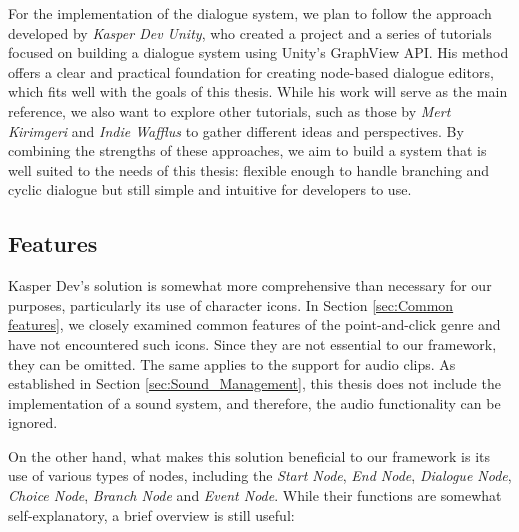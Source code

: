 For the implementation of the dialogue system, we plan to follow the approach developed by \textit{Kasper Dev Unity}, who created a project \cite{Kasper-Dialogue-Tutorial-git} and a series of tutorials \cite{Kasper-Dialogue-Tutorial-YT} focused on building a dialogue system using Unity’s GraphView API. His method offers a clear and practical foundation for creating node-based dialogue editors, which fits well with the goals of this thesis. While his work will serve as the main reference, we also want to explore other tutorials, such as those by \textit{Mert Kirimgeri} \cite{merpheus-Dialogue-Tutorial-git}\cite{merpheus-Dialogue-Tutorial-YT} and \textit{Indie Wafflus} \cite{Wafflus-Dialogue-Tutorial-git}\cite{Wafflus-Dialogue-Tutorial-YT} to gather different ideas and perspectives. By combining the strengths of these approaches, we aim to build a system that is well suited to the needs of this thesis: flexible enough to handle branching and cyclic dialogue but still simple and intuitive for developers to use. 

\subsection{Features}
\label{Analysis:Dialogue:Features}
Kasper Dev's solution is somewhat more comprehensive than necessary for our purposes, particularly its use of character icons. In Section \ref{sec:Common features}, we closely examined common features of the point-and-click genre and have not encountered such icons. Since they are not essential to our framework, they can be omitted. The same applies to the support for audio clips. As established in Section \ref{sec:Sound_Management}, this thesis does not include the implementation of a sound system, and therefore, the audio functionality can be ignored.

On the other hand, what makes this solution beneficial to our framework is its use of various types of nodes, including the \textit{Start Node}, \textit{End Node}, \textit{Dialogue Node}, \textit{Choice Node}, \textit{Branch Node} and \textit{Event Node}. While their functions are somewhat self-explanatory, a brief overview is still useful:

